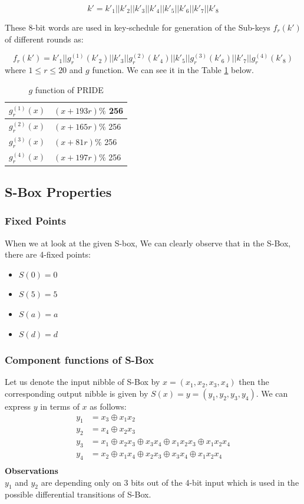 \documentclass{transcrypto}
\begin{document}
		$$ k' = k'_{1}||k'_{2}||k'_{3}||k'_{4}||k'_{5}||k'_{6}||k'_{7}||k'_{8} $$
	
		These 8-bit words are used in key-schedule for generation of the Sub-keys $ f_r(k') $ of different rounds as:
		
		$$ f_r(k') = k'_{1}||g_r^{(1)}(k'_{2})||k'_{3}||g_r^{(2)}(k'_{4})||k'_{5}||g_r^{(3)}(k'_{6})||k'_{7}||g_r^{(4)}(k'_{8})
		 $$
		where $ 1 \le r \le 20 $ and $ g $ function. We can see it in the Table \ref{g} below.
		\begin{table}[H]
			\centering
			\begin{tabular}{|c|l|}
				\hline
				$ g_r^{(1)}(x) $ &  $ (x + 193r) \% $ 256 \\ \hline
				$ g_r^{(2)}(x) $ &  $ (x + 165r) \% $ 256 \\ \hline
				$ g_r^{(3)}(x) $ &  $ (x + 81r) \% $ 256 \\ \hline
				$ g_r^{(4)}(x) $ &  $ (x + 197r) \% $ 256 \\ \hline
			\end{tabular}
			\caption{$g$ function of PRIDE}
			\label{g}
		\end{table}
	\subsection{S-Box Properties}
	\subsubsection{Fixed Points} When we at look at the given S-box, We can clearly observe that in the S-Box, there are 4-fixed points:
	\begin{itemize}
		\item $ S(0) = 0 $
		\item $ S(5) = 5 $
		\item $ S(a) = a $
		\item $ S(d) = d $
	\end{itemize}
	\subsubsection{Component functions of S-Box}
	Let us denote the input nibble of S-Box by $ x = (x_1,x_2,x_3,x_4) $ then the corresponding output nibble is given by $ S(x) = y = (y_1,y_2,y_3,y_4) $.
	We can express $ y $ in terms of $ x $ as follows:
	\begin{align*}
		y_1 &= x_3 \oplus x_1x_2\\ 
		y_2 &= x_4 \oplus x_2x_3\\ 
		y_3 &= x_1 \oplus x_2x_3 \oplus x_3x_4 \oplus x_1x_2x_3 \oplus x_1x_2x_4\\
		y_4 &= x_2 \oplus x_1x_4 \oplus x_2x_3 \oplus x_3x_4 \oplus x_1x_2x_4\\
	\end{align*}
	\textbf{Observations}\\
	$ y_1 $ and $ y_2 $ are depending only on 3 bits out of the 4-bit input which is used in the possible differential transitions of S-Box.
\end{document}
